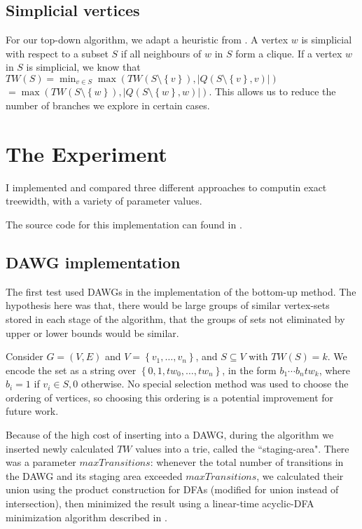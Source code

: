 \documentclass{article}
\newcommand\abs[1]{\left|#1\right|}
\newcommand\set[1]{\left\{#1\right\}}
\begin{document}
\subsection{Simplicial vertices}

For our top-down algorithm, we adapt a heuristic from \cite{upperBound}.
A vertex $w$ is simplicial with respect to a subset $S$ if all neighbours
of $w$ in $S$ form a clique.
If a vertex $w$ in $S$ is simplicial, we know that
$TW(S) = \min_{v \in S} \max(TW(S \setminus \set{v}), \abs{Q(S \setminus \set{v}, v)})$
$ =  \max(TW(S \setminus \set{w}), \abs{Q(S \setminus \set{w}, w)})$.
This allows us to reduce the number of branches we explore in certain cases.


\section{The Experiment}

I implemented and compared three different approaches to computin exact treewidth,
with a variety of parameter values.

The source code for this implementation can found in \cite{finalGithub}.

\subsection{DAWG implementation}

The first test used DAWGs in the implementation of the bottom-up method.
The hypothesis here was that, there would be large groups of similar vertex-sets
stored in each stage of the algorithm, that the groups of sets not eliminated
by upper or lower bounds would be similar.

Consider $G=(V,E)$ and $V = \set{v_1, \ldots, v_n}$,
and $S \subseteq V$ with $TW(S) = k$.
We encode the set as a string over $\set{0,1,tw_0, \ldots, tw_n}$,
in the form $b_1 \cdots b_n tw_k$, where
$b_i = 1$ if $v_i \in S, 0$ otherwise.
No special selection method was used to choose the ordering of vertices,
so choosing this ordering is a potential improvement for future work.

Because of the high cost of inserting into a DAWG, during the algorithm we
inserted newly calculated $TW$ values into a trie, called the ``staging-area".
There was a parameter $maxTransitions$: whenever the total number of transitions
in the DAWG and its staging area exceeded $maxTransitions$, we calculated their union
using the product construction for DFAs \cite{HU} (modified for union instead of intersection),
then minimized the result
using a linear-time acyclic-DFA minimization algorithm described in \cite{acyclicMin}.
\end{document}
